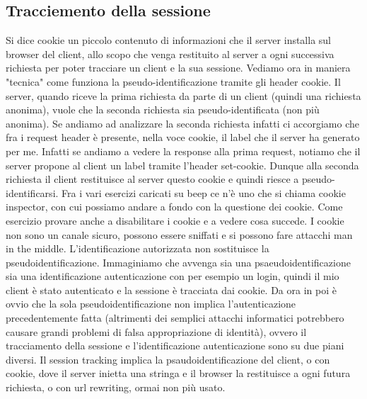 \subsection{Tracciemento della sessione}
Si dice cookie un piccolo contenuto di informazioni che il server installa sul browser del client, allo scopo che venga restituito al server a ogni successiva richiesta per poter tracciare un client e la sua sessione.\newline
Vediamo ora in maniera "tecnica" come funziona la pseudo-identificazione tramite gli header cookie. Il server, quando riceve la prima richiesta da parte di un client (quindi una richiesta anonima), vuole che la seconda richiesta sia pseudo-identificata (non più anonima). Se andiamo ad analizzare la seconda richiesta infatti ci accorgiamo che fra i request header è presente, nella voce cookie, il label che il server ha generato per me. Infatti se andiamo a vedere la response alla prima request, notiamo che il server propone al client un label tramite l'header set-cookie. Dunque alla seconda richiesta il client restituisce al server questo cookie e quindi riesce a pseudo-identificarsi.\newline
\newline
Fra i vari esercizi caricati su beep ce n'è uno che si chiama cookie inspector, con cui possiamo andare a fondo con la questione dei cookie. Come esercizio provare anche a disabilitare i cookie e a vedere cosa succede.\newline
\newline
I cookie non sono un canale sicuro, possono essere sniffati e si possono fare attacchi man in the middle.\newline
\newline
L'identificazione autorizzata non sostituisce la pseudoidentificazione. Immaginiamo che avvenga sia una psaeudoidentificazione sia una identificazione autenticazione con per esempio un login, quindi il mio client è stato autenticato e la sessione è tracciata dai cookie. Da ora in poi è ovvio che la sola pseudoidentificazione non implica l'autenticazione precedentemente fatta (altrimenti dei semplici attacchi informatici potrebbero causare grandi problemi di falsa appropriazione di identità), ovvero il tracciamento della sessione e l'identificazione autenticazione sono su due piani diversi.\newline
Il session tracking implica la psaudoidentificazione del client, o con cookie, dove il server inietta una stringa e il browser la restituisce a ogni futura richiesta, o con url rewriting, ormai non più usato.\newline
